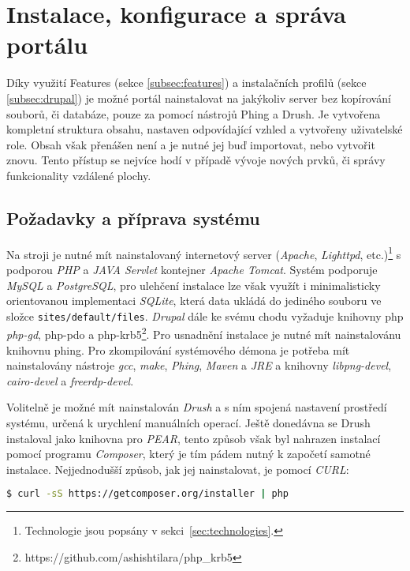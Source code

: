 \chapter{Instalace, konfigurace a správa portálu}
\label{chap:instalace}

Díky využití Features (sekce \ref{subsec:features}) a instalačních profilů (sekce \ref{subsec:drupal}) je možné portál nainstalovat na jakýkoliv server bez kopírování souborů, či databáze, pouze za pomocí nástrojů Phing a Drush. Je vytvořena kompletní struktura obsahu, nastaven odpovídající vzhled a vytvořeny uživatelské role. Obsah však přenášen není a je nutné jej buď importovat, nebo vytvořit znovu. Tento přístup se nejvíce hodí v případě vývoje nových prvků, či správy funkcionality vzdálené plochy.

\section{Požadavky a příprava systému}
\label{sec:priprava-systemu}

Na stroji je nutné mít nainstalovaný internetový server (\emph{Apache}, \emph{Lighttpd}, etc.)\footnote{Technologie jsou popsány v sekci~\ref{sec:technologies}.}  s podporou \emph{PHP} a \emph{JAVA Servlet} kontejner \emph{Apache Tomcat}. Systém podporuje \emph{MySQL} a \emph{PostgreSQL}, pro ulehčení instalace lze však využít i minimalisticky orientovanou implementaci \emph{SQLite}, která data ukládá do jediného souboru ve složce \texttt{sites/default/files}. \emph{Drupal} dále ke svému chodu vyžaduje knihovny php \emph{php-gd}, {php-pdo} a {php-krb5\footnote{https://github.com/ashishtilara/php\_krb5}}. Pro usnadnění instalace je nutné mít nainstalovánu knihovnu phing. Pro zkompilování systémového démona je potřeba mít nainstalovány nástroje \emph{gcc}, \emph{make}, \emph{Phing}, \emph{Maven} a \emph{JRE} a knihovny \emph{libpng-devel}, \emph{cairo-devel} a \emph{freerdp-devel}. 

Volitelně je možné mít nainstalován \emph{Drush} a s ním spojená nastavení prostředí systému, určená k urychlení manuálních operací. Ještě donedávna se Drush instaloval jako knihovna pro \emph{PEAR}, tento způsob však byl nahrazen instalací pomocí programu \emph{Composer}, který je tím pádem nutný k započetí samotné instalace. Nejjednodušší způsob, jak jej nainstalovat, je pomocí \emph{CURL}:

\begin{lstlisting}[language=bash]
  $ curl -sS https://getcomposer.org/installer | php
\end{lstlisting}

